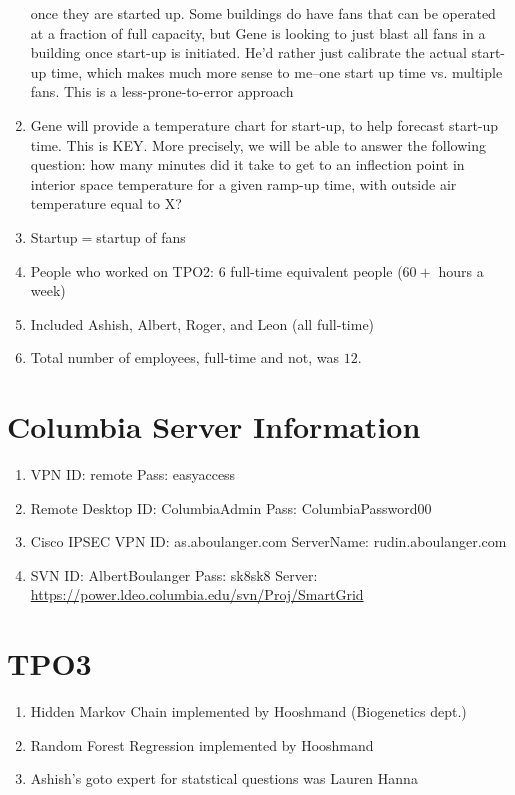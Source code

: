 \documentclass[12pt,a4paper]{article}
\begin{document}
\begin{enumerate}
		once they are started up. Some buildings do have fans that can be operated
		at a fraction of full capacity, but Gene is looking to just blast all fans
		in a building once start-up is initiated. He'd rather just calibrate
		the actual start-up time, which makes much more sense to me--one start up
		time vs. multiple fans. This is a less-prone-to-error approach
	\item Gene will provide a temperature chart for start-up, to help forecast
		start-up time. This is KEY. More precisely, we will be able to answer the
		following question: how many minutes did it take to get to an inflection
		point in interior space temperature for a given ramp-up time, with outside
		air temperature equal to X?
	\item Startup$=$startup of fans
	\item People who worked on TPO2: 6 full-time equivalent people ($60+$ hours
		a week)
	\item Included Ashish, Albert, Roger, and Leon (all full-time)
	\item Total number of employees, full-time and not, was $12$.
\end{enumerate}
\section{Columbia Server Information}
\begin{enumerate}
	\item{VPN} ID: remote Pass: easyaccess
	\item{Remote Desktop} ID: ColumbiaAdmin Pass: ColumbiaPassword00
	\item{Cisco IPSEC VPN} ID: as.aboulanger.com
		ServerName:	rudin.aboulanger.com
	\item{SVN} ID: AlbertBoulanger Pass: sk8sk8 Server:
		\url{https://power.ldeo.columbia.edu/svn/Proj/SmartGrid}
\end{enumerate}
\section{TPO3}
\begin{enumerate}
	\item Hidden Markov Chain implemented by Hooshmand (Biogenetics dept.)
	\item Random Forest Regression implemented by Hooshmand
	\item Ashish's goto expert for statstical questions was Lauren Hanna
\end{enumerate}
\end{document}
